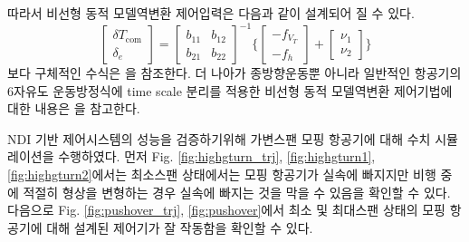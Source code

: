 \documentclass[a4paper, 12pt]{report}
\begin{document}
	따라서 비선형 동적 모델역변환 제어입력은 다음과 같이 설계되어 질 수 있다.
	\begin{equation}
		\begin{bmatrix}
			\delta T_{\text{com}}\\
			\delta_{e}
		\end{bmatrix}
		=
		\begin{bmatrix}
			b_{11} & b_{12} \\
			b_{21} & b_{22}
		\end{bmatrix}^{-1}
		\Bigg\{
		\begin{bmatrix}
			-f_{V_{T}} \\
			-f_{h}
		\end{bmatrix}
		+
		\begin{bmatrix}
			\nu_{1} \\
			\nu_{2}
		\end{bmatrix}
		\Bigg\}
	\end{equation}
	보다 구체적인 수식은 \cite{Wang2000}을 참조한다. 더 나아가 종방향운동뿐 아니라 일반적인 항공기의 6자유도 운동방정식에 time scale 분리를 적용한 비선형 동적 모델역변환 제어기법에 대한 내용은 \cite{Snell1992}을 참고한다. \par
	
	NDI 기반 제어시스템의 성능을 검증하기위해 가변스팬 모핑 항공기에 대해 수치 시뮬레이션을 수행하였다.
	먼저 Fig. \ref{fig:highgturn_trj}, \ref{fig:highgturn1}, \ref{fig:highgturn2}에서는 최소스팬 상태에서는 모핑 항공기가 실속에 빠지지만 비행 중에 적절히 형상을 변형하는 경우 실속에 빠지는 것을 막을 수 있음을 확인할 수 있다.
	다음으로 Fig. \ref{fig:pushover_trj}, \ref{fig:pushover}에서 최소 및 최대스팬 상태의 모핑 항공기에 대해 설계된 제어기가 잘 작동함을 확인할 수 있다.
	
\end{document}
